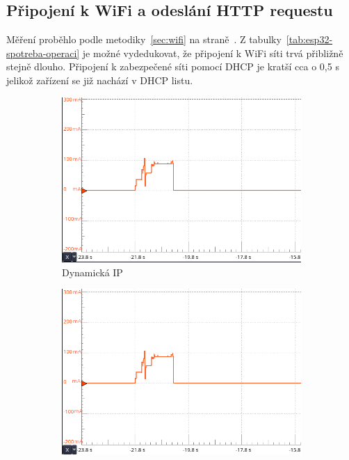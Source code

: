 \documentclass[a4paper, 12pt]{report}
\begin{document}
    \subsection{Připojení k WiFi a odeslání HTTP requestu}
    Měření proběhlo podle metodiky~\ref{sec:wifi} na straně~\pageref{sec:wifi}.
    Z tabulky~\ref{tab:esp32-spotreba-operaci} je možné vydedukovat, že připojení k WiFi síti trvá přibližně stejně dlouho.
    Připojení k zabezpečené síti pomocí DHCP je kratší cca o 0,5 s jelikož zařízení se již nachází v DHCP listu.
    \begin{figure}[!ht]
        \centering
        \begin{subfigure}[b]{0.55\linewidth}
            \includegraphics[width=\linewidth]{images/ESP32_network_dynamic}
            \caption{Dynamická IP}
        \end{subfigure}
        \begin{subfigure}[b]{0.55\linewidth}
            \includegraphics[width=\linewidth]{images/ESP32_network_static}

\end{subfigure}
\end{figure}
\end{document}
